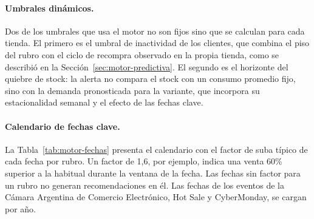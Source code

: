 \paragraph{Umbrales dinámicos.} Dos de los umbrales que usa el motor no son fijos sino que se calculan para cada tienda. El primero es el umbral de inactividad de los clientes, que combina el piso del rubro con el ciclo de recompra observado en la propia tienda, como se describió en la Sección~\ref{sec:motor-predictiva}. El segundo es el horizonte del quiebre de stock: la alerta no compara el stock con un consumo promedio fijo, sino con la demanda pronosticada para la variante, que incorpora su estacionalidad semanal y el efecto de las fechas clave.

\paragraph{Calendario de fechas clave.} La Tabla~\ref{tab:motor-fechas} presenta el calendario con el factor de suba típico de cada fecha por rubro. Un factor de 1,6, por ejemplo, indica una venta 60\% superior a la habitual durante la ventana de la fecha. Las fechas sin factor para un rubro no generan recomendaciones en él. Las fechas de los eventos de la Cámara Argentina de Comercio Electrónico, Hot Sale y CyberMonday, se cargan por año.

